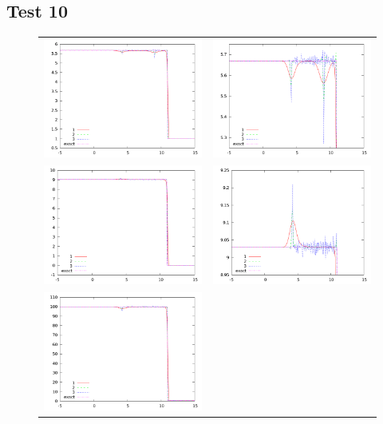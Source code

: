 \documentclass[10pt]{article}
\begin{document}
\clearpage

\subsection{Test 10}

\begin{figure}[h]
  \begin{center}
	\begin{tabular}{cc}
      \includegraphics[width=.4\textwidth]{den_T10.png} &
	  \includegraphics[width=.4\textwidth]{den10zoom.png} \\
	  \includegraphics[width=.4\textwidth]{vel_T10.png} &	
	  \includegraphics[width=.4\textwidth]{vel10zoom.png} \\
      \includegraphics[width=.4\textwidth]{prs_T10.png} &	

\end{tabular}
\end{center}
\end{figure}
\end{document}
